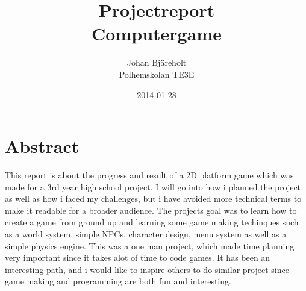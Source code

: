\documentclass[a4paper,12pt]{article}
\begin{document}
\title{Projectreport\\ 
       \small{Computergame}}
\author{Johan Bjäreholt\\
       \small{Polhemskolan TE3E}}
\date{2014-01-28}

\maketitle

\newpage

\section{Abstract}


This report is about the progress and result of a 2D platform game which was made for a 3rd year high school project.
I will go into how i planned the project as well as how i faced my challenges, but i have avoided more technical terms to make it readable for a broader audience.
The projects goal was to learn how to create a game from ground up and learning some game making techinques such as a world system, simple NPCs, character design, menu system as well as a simple physics engine.
This was a one man project, which made time planning very important since it takes alot of time to code games.
It has been an interesting path, and i would like to inspire others to do similar project since game making and programming are both fun and interesting.


\clearpage

\end{document}
